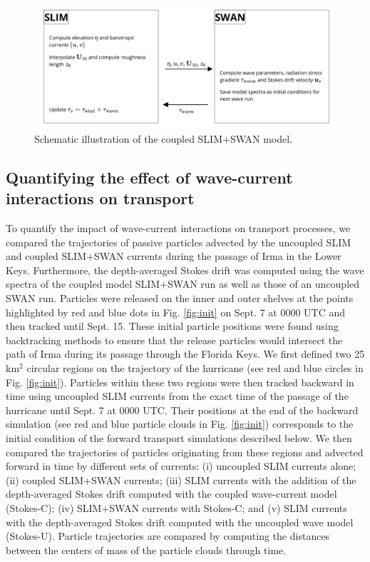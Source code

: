 \documentclass[preprint,12pt,authoryear]{elsarticle}
\begin{document}
\begin{figure}
    \centering
    \includegraphics[width=.99\textwidth]{coupling_v2.png}
    \caption{Schematic illustration of the coupled SLIM+SWAN model.}
    \label{fig:coupling}
\end{figure}

\subsection{Quantifying the effect of wave-current interactions on transport}\label{sec:traj}

To quantify the impact of wave-current interactions on transport processes, we compared the trajectories of passive particles advected by the uncoupled SLIM and coupled SLIM+SWAN currents during the passage of Irma in the Lower Keys. Furthermore, the depth-averaged Stokes drift was computed using the wave spectra of the coupled model SLIM+SWAN run as well as those of an uncoupled SWAN run. Particles were released on the inner and outer shelves at the points highlighted by red and blue dots in Fig. \ref{fig:init} on Sept. 7 at 0000 UTC and then tracked until Sept. 15. These initial particle positions were found using backtracking methods \citep{spivakovskaya2005simulation} to ensure that the release particles would intersect the path of Irma during its passage through the Florida Keys. We first defined two 25 km$^\text{2}$ circular regions on the trajectory of the hurricane (see red and blue circles in Fig. \ref{fig:init}). Particles within these two regions were then tracked backward in time using uncoupled SLIM currents from the exact time of the passage of the hurricane until Sept. 7 at 0000 UTC. Their positions at the end of the backward simulation (see red and blue particle clouds in Fig. \ref{fig:init}) corresponds to the initial condition of the forward transport simulations described below. We then compared the trajectories of particles originating from these regions and advected forward in time by different sets of currents: (i) uncoupled SLIM currents alone; (ii) coupled SLIM+SWAN currents; (iii) SLIM currents with the addition of the depth-averaged Stokes drift computed with the coupled wave-current model (Stokes-C); (iv) SLIM+SWAN currents with Stokes-C; and (v) SLIM currents with the depth-averaged Stokes drift computed with the uncoupled wave model (Stokes-U). Particle trajectories are compared by computing the distances between the centers of mass of the particle clouds through time.
\end{document}
